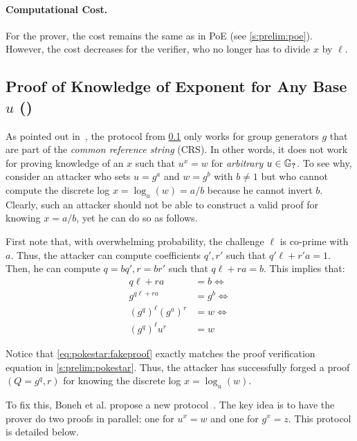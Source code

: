 \paragraph{Computational Cost.}
For the prover, the cost remains the same as in PoE (see \cref{s:prelim:poe}).
However, the cost decreases for the verifier, who no longer has to divide $x$ by $\ell$.

\subsection{Proof of Knowledge of Exponent for Any Base $u$ (\poke)}
\label{s:prelim:poke}

As pointed out in~\cite{BBF19}, the \pokestar protocol from \cref{s:prelim:poke} only works for group generators $g$ that are part of the \textit{common reference string} (CRS).
In other words, it does not work for proving knowledge of an $x$ such that $u^x = w$ for \textit{arbitrary} $u\in \mathbb{G}_{\textbf{?}}$.
To see why, consider an attacker who sets $u=g^a$ and $w=g^b$ with $b\ne 1$ but who cannot compute the discrete log $x=\log_u(w) = a/b$ because he cannot invert $b$.
Clearly, such an attacker should not be able to construct a valid \pokestar proof for knowing $x=a/b$, yet he can do so as follows.

First note that, with overwhelming probability, the challenge $\ell$ is co-prime with $a$.
Thus, the attacker can compute \bezout coefficients $q',r'$ such that $q'\ell + r' a = 1$.
Then, he can compute $q=b q', r = b r'$ such that $q\ell + ra = b$.
This implies that:
\begin{align}
q\ell + ra &= b\Leftrightarrow\\
g^{q\ell + ra} &= g^b\Leftrightarrow\\
(g^{q})^\ell (g^a)^r &= w\Leftrightarrow\\
(g^{q})^\ell u^r &= w
\label{eq:pokestar:fakeproof}
\end{align}

Notice that \cref{eq:pokestar:fakeproof} exactly matches the \pokestar proof verification equation in \cref{s:prelim:pokestar}.
Thus, the attacker has successfully forged a \pokestar proof $(Q=g^q, r)$ for knowing the discrete log $x=\log_u(w)$.

To fix this, Boneh et al. propose a new \poke protocol~\cite{BBF19}.
The key idea is to have the prover do two \pokestar proofs in parallel: one for $u^x = w$ and one for $g^x = z$.
This protocol is detailed below.\\

